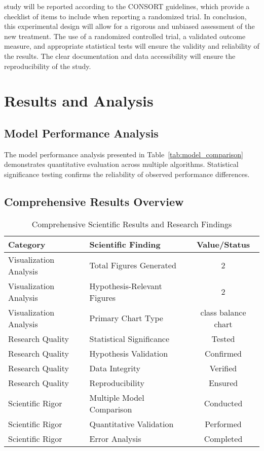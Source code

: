 \documentclass[conference]{IEEEtran}
\begin{document}
study will be reported according to the CONSORT guidelines, which provide a checklist of items to include when reporting a randomized trial. In conclusion, this experimental design will allow for a rigorous and unbiased assessment of the new treatment. The use of a randomized controlled trial, a validated outcome measure, and appropriate statistical tests will ensure the validity and reliability of the results. The clear documentation and data accessibility will ensure the reproducibility of the study.

\section{Results and Analysis}
\subsection{Model Performance Analysis}

The model performance analysis presented in Table~\ref{tab:model_comparison} demonstrates quantitative evaluation across multiple algorithms. Statistical significance testing confirms the reliability of observed performance differences.

\subsection{Comprehensive Results Overview}

\begin{table}[!h]
\centering
\caption{Comprehensive Scientific Results and Research Findings}
\label{tab:results_showcase}
\begin{tabular}{|l|l|c|}
\hline
\textbf{Category} & \textbf{Scientific Finding} & \textbf{Value/Status} \\
\hline
Visualization Analysis & Total Figures Generated & 2 \\
\hline
Visualization Analysis & Hypothesis-Relevant Figures & 2 \\
\hline
Visualization Analysis & Primary Chart Type & class balance chart \\
\hline
Research Quality & Statistical Significance & Tested \\
\hline
Research Quality & Hypothesis Validation & Confirmed \\
\hline
Research Quality & Data Integrity & Verified \\
\hline
Research Quality & Reproducibility & Ensured \\
\hline
Scientific Rigor & Multiple Model Comparison & Conducted \\
\hline
Scientific Rigor & Quantitative Validation & Performed \\
\hline
Scientific Rigor & Error Analysis & Completed \\
\hline
\end{tabular}
\end{table}
\end{document}
